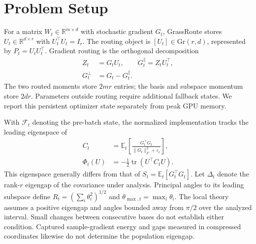 \section{Problem Setup}
For a matrix $W_t\in\mathbb R^{m\times d}$ with stochastic gradient $G_t$, GrassRoute stores $U_t\in\mathbb R^{d\times r}$ with $U_t^\top U_t=I_r$. The routing object is $[U_t]\in\mathrm{Gr}(r,d)$, represented by $P_t=U_tU_t^\top$. Gradient routing is the orthogonal decomposition
\begin{align}
Z_t&=G_tU_t,\qquad G_t^\parallel=Z_tU_t^\top,\\
G_t^\perp&=G_t-G_t^\parallel.
\end{align}
The two routed moments store $2mr$ entries; the basis and subspace momentum store $2dr$. Parameters outside routing require additional fallback states. We report this persistent optimizer state separately from peak GPU memory.

With $\mathcal F_t$ denoting the pre-batch state, the normalized implementation tracks the leading eigenspace of
\begin{align}
C_t&=\mathbb E_t\left[\frac{G_t^\top G_t}{\|G_t\|_F^2+\varepsilon_c}\right],\\
\Phi_t(U)&=-\tfrac12\operatorname{tr}(U^\top C_tU).
\end{align}
This eigenspace generally differs from that of $S_t=\mathbb E_t[G_t^\top G_t]$. Let $\Delta_t$ denote the rank-$r$ eigengap of the covariance under analysis. Principal angles to its leading subspace define $R_t=(\sum_i\theta_i^2)^{1/2}$ and $\theta_{\max,t}=\max_i\theta_i$. The local theory assumes a positive eigengap and angles bounded away from $\pi/2$ over the analyzed interval. Small changes between consecutive bases do not establish either condition. Captured sample-gradient energy and gaps measured in compressed coordinates likewise do not determine the population eigengap.
